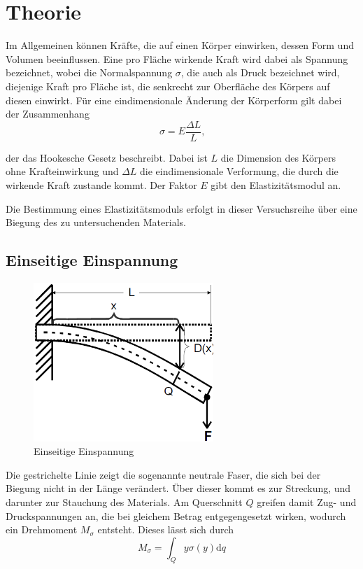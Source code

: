 \section{Theorie}
\label{sec:Theorie}

Im Allgemeinen können Kräfte, die auf einen Körper einwirken, dessen Form und Volumen beeinflussen. 
Eine pro Fläche wirkende Kraft wird dabei als Spannung bezeichnet, wobei die Normalspannung $\sigma$, die auch als Druck bezeichnet wird,
diejenige Kraft pro Fläche ist, die senkrecht zur Oberfläche des Körpers auf diesen einwirkt. Für eine eindimensionale Änderung der
Körperform gilt dabei der Zusammenhang \begin{equation}
    \sigma = E \frac{\Delta L}L \text{,}
\end{equation}

 der das Hookesche Gesetz beschreibt. Dabei ist $L$ die Dimension des Körpers ohne Krafteinwirkung und $\Delta L$ die eindimensionale
Verformung, die durch die wirkende Kraft zustande kommt. Der Faktor $E$ gibt den Elastizitätsmodul an.

Die Bestimmung eines Elastizitätsmoduls erfolgt in dieser Versuchsreihe über eine Biegung des zu 
untersuchenden Materials. 

\subsection{Einseitige Einspannung}

\begin{figure}
    \centering
    \includegraphics[height=6cm]{data/bild_1}
    \caption{Einseitige Einspannung}
\end{figure}

Die gestrichelte Linie zeigt die sogenannte neutrale Faser, die sich bei der Biegung nicht in der Länge verändert. 
Über dieser kommt es zur Streckung, und darunter zur Stauchung des Materials. Am Querschnitt $Q$ greifen damit Zug- und Druckspannungen
an, die bei gleichem Betrag entgegengesetzt wirken, wodurch ein Drehmoment $M_{\sigma}$ entsteht. Dieses lässt sich durch \begin{equation}
    M_{\sigma} = \int_Q y\sigma(y)\text{d}q
\end{equation}

